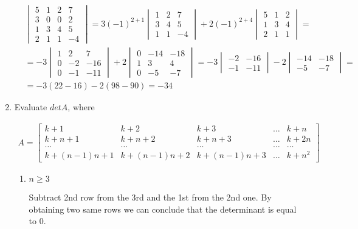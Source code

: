 \documentclass{article}
\begin{document}
\begin{enumerate}
\begin{align*}
&\begin{vmatrix}
5&1&2&7\\
3&0&0&2\\
1&3&4&5\\
2&1&1&-4
\end{vmatrix}=3(-1)^{2+1}\begin{vmatrix}
1&2&7\\
3&4&5\\
1&1&-4
\end{vmatrix}+2(-1)^{2+4}\begin{vmatrix}
5&1&2\\
1&3&4\\
2&1&1
\end{vmatrix}=\\
&=-3\begin{vmatrix}
1&2&7\\
0&-2&-16\\
0&-1&-11
\end{vmatrix}+2\begin{vmatrix}
0&-14&-18\\
1&3&4\\
0&-5&-7
\end{vmatrix}=-3\begin{vmatrix}
-2&-16\\
-1&-11
\end{vmatrix}-2\begin{vmatrix}
-14&-18\\
-5&-7
\end{vmatrix}=\\
&=-3(22-16)-2(98-90)=-34
\end{align*}

\newpage
\item Evaluate $det A$, where

\begin{align*}
A=
\begin{bmatrix}
k+1&k+2&k+3&\ldots{}&k+n\\
k+n+1&k+n+2&k+n+3&\ldots{}&k+2n\\
\ldots{}&\ldots{}&\ldots{}&\ldots{}&\ldots{}\\
k+(n-1)n+1&k+(n-1)n+2&k+(n-1)n+3&\ldots{}&k+n^2
\end{bmatrix}
\end{align*}

\begin{enumerate}
\item $n \geq 3$

Subtract 2nd row from the 3rd and the 1st from the 2nd one. By obtaining two same rows we can conclude that the determinant is equal to $0$.


\end{enumerate}
\end{enumerate}
\end{document}
